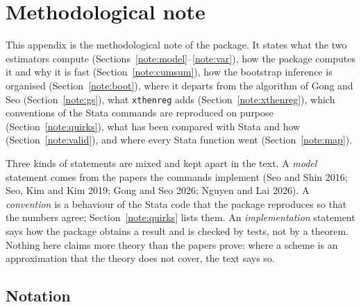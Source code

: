 \clearpage
\setcounter{secnumdepth}{3}
\appendix
\providecommand{\E}{\operatorname{E}}
\newcommand{\code}[1]{\texttt{\detokenize{#1}}}
\newcommand{\ind}{\mathbf{1}}
\newcommand{\bZ}{\mathbf{Z}}
\newcommand{\bX}{\mathbf{X}}
\newcommand{\diff}{\Delta}
\newcommand{\statasrc}[1]{\texttt{\detokenize{#1}}}

\section{Methodological note}\label{app:note}

This appendix is the methodological note of the package. It states what the two estimators
compute (Sections~\ref{note:model}--\ref{note:var}), how the package computes it and why it is
fast (Section~\ref{note:cumsum}), how the bootstrap inference is organised
(Section~\ref{note:boot}), where it departs from the algorithm of Gong and Seo
(Section~\ref{note:gs}), what \texttt{xthenreg} adds (Section~\ref{note:xthenreg}), which conventions of the
Stata commands are reproduced on purpose (Section~\ref{note:quirks}), what has been compared with Stata and how
(Section~\ref{note:valid}), and where every Stata function went (Section~\ref{note:map}).

Three kinds of statements are mixed and kept apart in the text. A \emph{model} statement comes from
the papers the commands implement (Seo and Shin 2016; Seo, Kim and Kim 2019; Gong and Seo 2026;
Nguyen and Lai 2026). A \emph{convention} is a behaviour of the Stata code that the package
reproduces so that the numbers agree; Section~\ref{note:quirks} lists them. An \emph{implementation}
statement says how the package obtains a result and is checked by tests, not by a theorem.
Nothing here claims more theory than the papers prove: where a scheme is an approximation that the
theory does not cover, the text says so.

\subsection{Notation}\label{note:notation}

